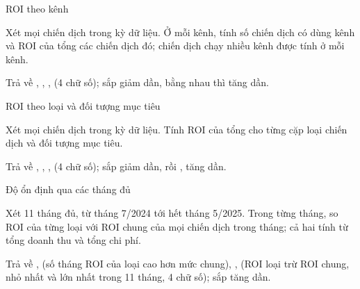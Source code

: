 \documentclass[11pt,a4paper]{article}
\begin{document}
\begin{cauhoi}[ma=mkt-c10-don-ngan-sach-loai-kenh, dulieu=mkt, domain=finance,
  hinhthuc=case, cap=hard, diem=50, tacgia={A}, trangthai=review, bokiemtra={public, hidden-1}, thutu=co, saiso=0.01]
\begin{buoc}[ma=b2, diem=10, hinhthuc=write, bang={campaigns, campaign_channels, channels}]{ROI theo kênh}
  \begin{yeucau}
    \item Xét mọi chiến dịch trong kỳ dữ liệu. Ở mỗi kênh, tính số chiến dịch có dùng kênh và ROI của tổng các chiến dịch đó; chiến dịch chạy nhiều kênh được tính ở mỗi kênh.
    \item Trả về , , ,  (4 chữ số); sắp  giảm dần, bằng nhau thì  tăng dần.
  \end{yeucau}
\end{buoc}
\begin{buoc}[ma=b3, diem=10, hinhthuc=write, bang={campaigns, campaign_types, audiences}]{ROI theo loại và đối tượng mục tiêu}
  \begin{yeucau}
    \item Xét mọi chiến dịch trong kỳ dữ liệu. Tính ROI của tổng cho từng cặp loại chiến dịch và đối tượng mục tiêu.
    \item Trả về , , ,  (4 chữ số); sắp  giảm dần, rồi ,  tăng dần.
  \end{yeucau}
\end{buoc}
\begin{buoc}[ma=b4, diem=10, hinhthuc=write, bang={campaigns}]{Độ ổn định qua các tháng đủ}
  \begin{yeucau}
    \item Xét 11 tháng đủ, từ tháng 7/2024 tới hết tháng 5/2025. Trong từng tháng, so ROI của từng loại với ROI chung của mọi chiến dịch trong tháng; cả hai tính từ tổng doanh thu và tổng chi phí.
    \item Trả về ,  (số tháng ROI của loại cao hơn mức chung), ,  (ROI loại trừ ROI chung, nhỏ nhất và lớn nhất trong 11 tháng, 4 chữ số); sắp  tăng dần.
  \end{yeucau}
\end{buoc}

\end{cauhoi}
\end{document}
